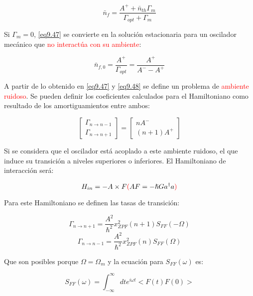 \documentclass{book}
\begin{document}
\begin{equation}\label{eq9.47}\bar{n}_f=\frac{A^++\bar{n}_{th}\Gamma_m}{\Gamma_{opt}+\Gamma_{m}}\end{equation}

Si $\Gamma_m=0$, \ref{eq9.47} se convierte en la solución estacionaria para un oscilador mecánico que \textcolor{red}{no interactúa con su ambiente}:

\begin{equation}\label{eq9.48}\bar{n}_{f,0}=\frac{A^+}{\Gamma_{opt}}=\frac{A^+}{A^--A^+}\end{equation}

A partir de lo obtenido en \ref{eq9.47} y \ref{eq9.48} se define un problema de \textcolor{red}{ambiente ruidoso}. Se pueden definir los coeficientes calculados para el Hamiltoniano como resultado de los amortiguamientos entre ambos:

\begin{equation}\label{eq9.49}\begin{bmatrix}\Gamma_{n\rightarrow n-1}\\ \Gamma_{n\rightarrow n+1}\end{bmatrix}=\begin{bmatrix} nA^-\\(n+1)A^+
\end{bmatrix}\end{equation}

Si se considera que el oscilador está acoplado a este ambiente ruidoso, el que induce su transición a niveles superiores o inferiores. El Hamiltoniano de interacción será:

\begin{equation}\label{eq9.50} H_{in}=-A\times F \textcolor{red}{(}AF=-\hslash G a^\dag a\textcolor{red}{)}\end{equation}

Para este Hamiltoniano se definen las tasas de transición:

\begin{equation}\label{eq9.51}\Gamma_{n\rightarrow n+1}=\frac{A^2}{\hslash^2}x^2_{ZPF}(n+1)S_{FF}(-\Omega)\end{equation}
\begin{equation}\label{eq9.52}\Gamma_{n\rightarrow n-1}=\frac{A^2}{\hslash^2}x^2_{ZPF}(n)S_{FF}(\Omega)\end{equation}

Que son posibles porque $\Omega=\Omega_m$ y la ecuación para $S_{FF}(\omega)$ es:

\begin{equation}\label{eq9.53}S_{FF}(\omega)=\int_{-\infty}^\infty dte^{i\omega t}<F(t)F(0)>\end{equation}
\end{document}
